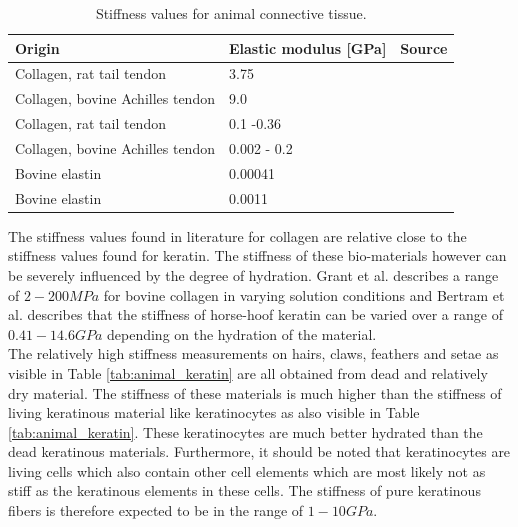\begin{table}[h!]
\centering
\begin{tabular}{p{3cm}|p{2.5cm}|p{1cm}}
Origin                               & Elastic modulus [GPa] & Source                 \\
\hline
Collagen, rat tail tendon            & 3.75                  &\cite{wenger2007mechanical}\\
Collagen, bovine Achilles tendon     & 9.0                   &\cite{harley1977phonons}\\
Collagen, rat tail tendon            & 0.1 -0.36             &\cite{dutov2016measurement}\\  
Collagen, bovine Achilles tendon     & 0.002 - 0.2           &\cite{grant2009tuning}\\
Bovine elastin                       & 0.00041               &\cite{aaron1981elastin}\\
Bovine elastin                       & 0.0011                &\cite{gosline2002elastic}
\end{tabular}
\caption{Stiffness values for animal connective tissue.}
\label{tab:animal_collagen}
\end{table}


\qquad The stiffness values found in literature for collagen are relative close to the stiffness values found for keratin. The stiffness of these bio-materials however can be severely influenced by the degree of hydration. Grant et al. describes a range of $2-200 MPa$ for bovine collagen in varying solution conditions \cite{grant2009tuning} and Bertram et al. \cite{bertram1987functional} describes that the stiffness of horse-hoof keratin can be varied over a range of $0.41 - 14.6 GPa$  depending on the hydration of the material.\\ 

\qquad The relatively high stiffness measurements on hairs, claws, feathers and setae as visible in Table \ref{tab:animal_keratin} are all obtained from dead and relatively dry material. The stiffness of these materials is much higher than the stiffness of living keratinous material like keratinocytes as also visible in Table \ref{tab:animal_keratin}. These keratinocytes are much better hydrated than the dead keratinous materials. Furthermore, it should be noted that keratinocytes are living cells which also contain other cell elements which are most likely not as stiff as the keratinous elements in these cells. The stiffness of pure keratinous fibers is therefore expected to be in the range of $1-10 GPa$.\\ 

